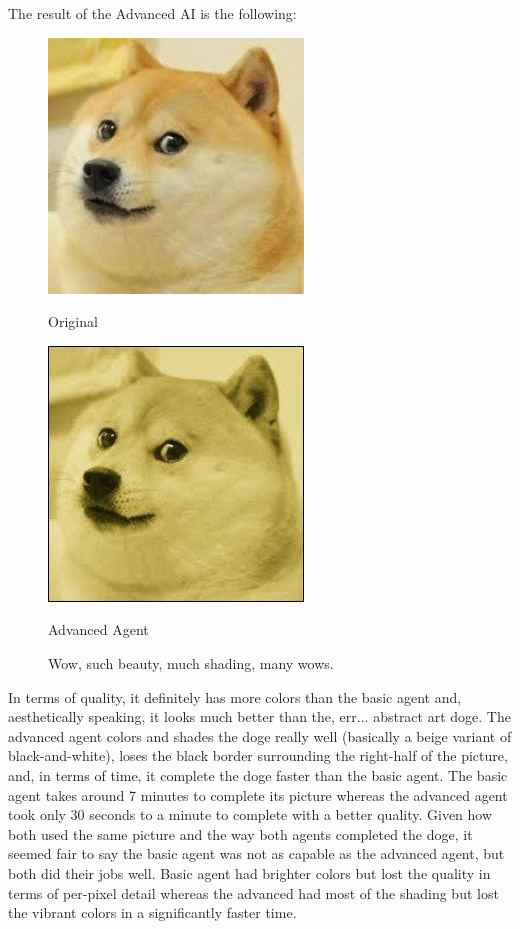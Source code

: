 \documentclass[11pt]{article}
\begin{document}
The result of the Advanced AI is the following:

\begin{figure}[h]
\begin{minipage}[c]{0.5\textwidth}
\centering
\includegraphics[scale=0.94]{images/smolDoge.jpg}
\begin{center}
Original
\end{center}
\end{minipage}
\begin{minipage}[c]{0.5\textwidth}
\centering
\includegraphics[scale=0.70]{images/advanced_v4.jpg}
\begin{center}
Advanced Agent
\end{center}
\end{minipage}
\caption{Wow, such beauty, much shading, many wows.}
\end{figure}

In terms of quality, it definitely has more colors than the basic agent and, aesthetically speaking, it looks much better than the, err... abstract art doge. The advanced agent colors and shades the doge really well (basically a beige variant of black-and-white), loses the black border surrounding the right-half of the picture, and, in terms of time, it complete the doge faster than the basic agent. The basic agent takes around 7 minutes to complete its picture whereas the advanced agent took only 30 seconds to a minute to complete with a better quality. Given how both used the same picture and the way both agents completed the doge, it seemed fair to say the basic agent was not as capable as the advanced agent, but both did their jobs well. Basic agent had brighter colors but lost the quality in terms of per-pixel detail whereas the advanced had most of the shading but lost the vibrant colors in a significantly faster time.
\end{document}
